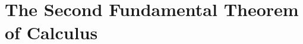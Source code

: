 \section{The Second Fundamental Theorem of Calculus} \label{S:5.2.FTC2}
	


\newpage



\newpage



\newpage



\newpage

\clearpage
